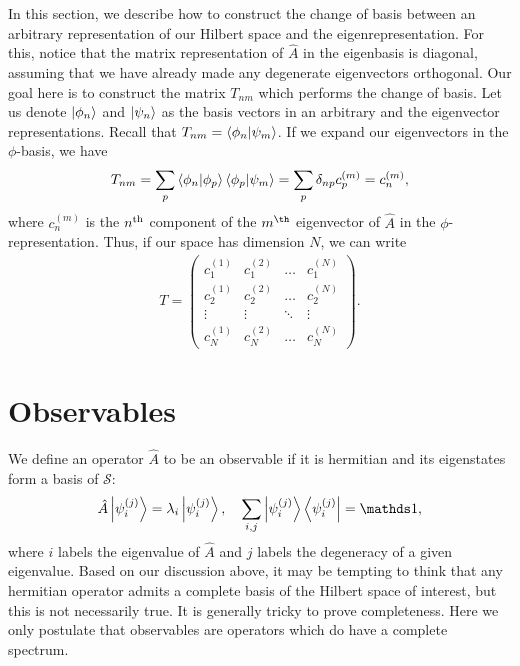 In this section, we describe how to construct the change of basis between an arbitrary representation of our Hilbert space and the eigenrepresentation.
For this, notice that the matrix representation of $\hat{A}$ in the eigenbasis is diagonal, assuming that we have already made any degenerate eigenvectors orthogonal.
Our goal here is to construct the matrix $T_{nm}$ which performs the change of basis.
Let us denote $\ket{\phi_{n}}$ and $\ket{\psi_{n}}$ as the basis vectors in an arbitrary and the eigenvector representations.
Recall that $T_{nm} = \bra{\phi_{n}}\ket{\psi_{m}}$.
If we expand our eigenvectors in the $\phi$-basis, we have
\begin{eqnarray}
    T_{nm} = \sum_{p} \bra{\phi_{n}} \ket{\phi_{p}} \bra{\phi_{p}} \ket{\psi_{m}} = \sum_{p} \delta_{np} c_{p}^{(m)} = c_{n}^{(m)}
,\end{eqnarray}
where $c_{n}^{(m)}$ is the $n^{\rm th}$ component of the $m^{\th}$ eigenvector of $\hat{A}$ in the $\phi$-representation.
Thus, if our space has dimension $N$, we can write
\begin{eqnarray}
    T = \begin{pmatrix}
        c_{1}^{(1)} & c_{1}^{(2)} & \ldots & c_{1}^{(N)} \\
        c_2^{(1)} & c_{2}^{(2)} & \ldots & c_{2}^{(N)} \\
        \vdots & \vdots & \ddots & \vdots \\
        c_{N}^{(1)} & c_{N}^{(2)} & \ldots & c_{N}^{(N)}
    \end{pmatrix}
.\end{eqnarray}


\section{Observables}

We define an operator $\hat{A}$ to be an observable if it is hermitian and its eigenstates form a basis of $\mathcal{S}$:
\begin{eqnarray}
    \hat{A} \ket{\psi_{i}^{(j)}} = \lambda_{i} \ket{\psi_{i}^{(j)}}, \quad \sum_{i,j} \ket{\psi_{i}^{(j)}} \bra{\psi_{i}^{(j)}} = \id
,\end{eqnarray}
where $i$ labels the eigenvalue of $\hat{A}$ and $j$ labels the degeneracy of a given eigenvalue.
Based on our discussion above, it may be tempting to think that any hermitian operator admits a complete basis of the Hilbert space of interest, but this is not necessarily true.
It is generally tricky to prove completeness.
Here we only postulate that observables are operators which do have a complete spectrum.


